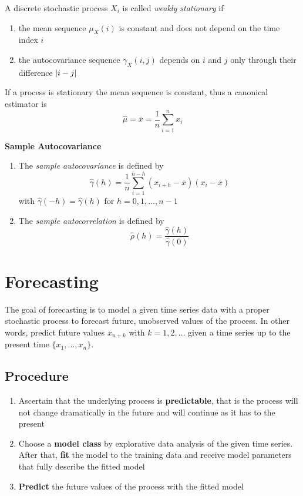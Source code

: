 \documentclass[11pt]{article}
\newcommand*\samplemean[1]{\overline{#1}}
\DeclarePairedDelimiter\abs{\lvert}{\rvert}
\begin{document}
\begin{definition}
	A discrete stochastic process $X_i$ is called \emph{weakly stationary} if
	\begin{enumerate}
		\item the mean sequence $\mu_X(i)$ is constant and does not depend on the time index $i$
		\item the autocovariance sequence $\gamma_X(i,j)$ depends on $i$ and $j$ only through their difference $\abs{i-j}$
	\end{enumerate}
\end{definition}

If a process is stationary the mean sequence is constant, thus a canonical estimator is
\begin{equation*}
	\hat{\mu} = \samplemean{x} = \frac{1}{n}\sum_{i=1}^n x_i
\end{equation*}
\begin{definition}
	\textbf{Sample Autocovariance}
	\begin{enumerate}
		\item The \emph{sample autocovariance} is defined by
		\begin{equation*}
			\hat{\gamma}(h) = \frac{1}{n}\sum_{i=1}^{n-h}(x_{i+h}-\samplemean{x})(x_i - \samplemean{x})
		\end{equation*}
		with $\hat{\gamma}(-h) =\hat{\gamma}(h)$ for $h=0,1,\dots,n-1$
		\item The \emph{sample autocorrelation} is defined by
		\begin{equation*}
			\hat{\rho}(h) = \frac{\hat{\gamma}(h)}{\hat{\gamma}(0)}
		\end{equation*}
	\end{enumerate}
\end{definition}

\section{Forecasting}

The goal of forecasting is to model a given time series data with a proper stochastic process to forecast future, unobserved values of the process. In other words, predict future values $x_{n+k}$ with $k=1,2,\dots$ given a time series up to the present time $\{x_1,\dots,x_n\}$.

\subsection{Procedure}
\begin{enumerate}
	\item Ascertain that the underlying process is \textbf{predictable}, that is the process will not change dramatically in the future and will continue as it has to the present
	\item Choose a \textbf{model class} by explorative data analysis of the given time series. After that, \textbf{fit} the model to the training data and receive model parameters that fully describe the fitted model
	\item \textbf{Predict} the future values of the process with the fitted model
\end{enumerate}
\end{document}

